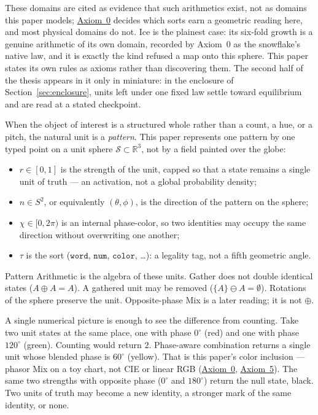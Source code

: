 \documentclass[12pt, a4paper]{article}
\begin{document}
These domains are cited as evidence that such arithmetics exist, not
as domains this paper models;
\hyperref[subsec:axiom0_admissibility]{Axiom~0} decides which sorts
earn a geometric reading here, and most physical domains do not.
Ice is the plainest case: its six-fold growth is a genuine arithmetic
of its own domain, recorded by Axiom~0 as the snowflake's native law,
and it is exactly the kind refused a map onto this sphere. This
paper states its own rules as axioms rather than discovering them.
The second half of the thesis appears in it only in miniature: in the
enclosure of Section~\ref{sec:enclosure}, units left under one fixed
law settle toward equilibrium and are read at a stated checkpoint.

When the object of interest is a structured whole rather than a
count, a hue, or a pitch, the natural unit is a \emph{pattern}.
This paper represents one pattern by one typed point on a unit
sphere $\mathcal{S} \subset \mathbb{R}^3$, not by a field painted over the globe:
\begin{itemize}
    \item $r \in [0, 1]$ is the strength of the unit, capped so that a state remains a single unit of truth --- an activation, not a global probability density;
    \item $\hat n \in S^2$, or equivalently $(\theta, \phi)$, is the direction of the pattern on the sphere;
    \item $\chi \in [0, 2\pi)$ is an internal phase-color, so two identities may occupy the same direction without overwriting one another;
    \item $\tau$ is the sort ($\mathtt{word}$, $\mathtt{num}$, $\mathtt{color}$, \ldots): a legality tag, not a fifth geometric angle.
\end{itemize}
Pattern Arithmetic is the algebra of these units. Gather does not double identical states ($A \oplus A = A$). A gathered unit may be removed ($\{A\} \ominus A = \emptyset$). Rotations of the sphere preserve the unit. Opposite-phase Mix is a later reading; it is not $\oplus$.

A single numerical picture is enough to see the difference from counting. Take two unit states at the same place, one with phase $0^\circ$ (red) and one with phase $120^\circ$ (green). Counting would return $2$. Phase-aware combination returns a single unit whose blended phase is $60^\circ$ (yellow). That is this paper's color inclusion --- phasor Mix on a toy chart, not CIE or linear RGB (\hyperref[subsec:axiom0_admissibility]{Axiom~0}, \hyperref[subsec:axiom_interference]{Axiom~5}). The same two strengths with opposite phase ($0^\circ$ and $180^\circ$) return the null state, black. Two units of truth may become a new identity, a stronger mark of the same identity, or none.
\end{document}
